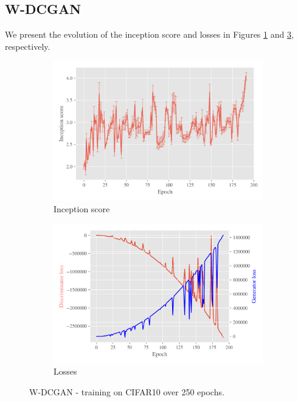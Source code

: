 \subsection{W-DCGAN}
\label{sec:exp-w-dcgan}
We present the evolution of the inception score and losses in Figures \ref{fig:exp-w-dcgan-is} and \ref{fig:exp-w-dcgan-losses}, respectively.
   
\begin{figure}[t!]
    \centering
    \begin{subfigure}[t]{0.49\textwidth}
        \centering
		\includegraphics[width=\textwidth]{../code/results/figures/w-dcgan_cifar10_is.png}
		\caption{Inception score}
		\label{fig:exp-w-dcgan-is}
    \end{subfigure}
    \begin{subfigure}[t]{0.49\textwidth}
        \centering
        \includegraphics[width=\textwidth]{../code/results/figures/w-dcgan_cifar10_losses.png}
		\caption{Losses}
		\label{fig:exp-w-dcgan-losses}
    \end{subfigure}
    \caption{W-DCGAN - training on CIFAR10 over 250 epochs.}
\end{figure}